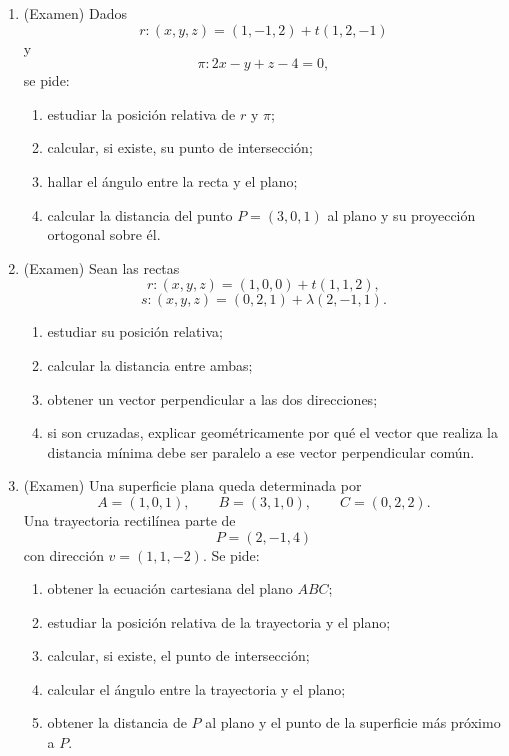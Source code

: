\begin{enumerate}
\item (Examen) Dados
\[
r:(x,y,z)=(1,-1,2)+t(1,2,-1)
\]
y
\[
\pi:2x-y+z-4=0,
\]
se pide:
\begin{enumerate}[label=\alph*)]
\item estudiar la posición relativa de $r$ y $\pi$;
\item calcular, si existe, su punto de intersección;
\item hallar el ángulo entre la recta y el plano;
\item calcular la distancia del punto $P=(3,0,1)$ al plano y su proyección ortogonal sobre él.
\end{enumerate}

\item (Examen) Sean las rectas
\[
r:(x,y,z)=(1,0,0)+t(1,1,2),
\]
\[
s:(x,y,z)=(0,2,1)+\lambda(2,-1,1).
\]
\begin{enumerate}[label=\alph*)]
\item estudiar su posición relativa;
\item calcular la distancia entre ambas;
\item obtener un vector perpendicular a las dos direcciones;
\item si son cruzadas, explicar geométricamente por qué el vector que realiza la distancia mínima debe ser paralelo a ese vector perpendicular común.
\end{enumerate}

\item (Examen) Una superficie plana queda determinada por
\[
A=(1,0,1),\qquad B=(3,1,0),\qquad C=(0,2,2).
\]
Una trayectoria rectilínea parte de
\[
P=(2,-1,4)
\]
con dirección $v=(1,1,-2)$. Se pide:
\begin{enumerate}[label=\alph*)]
\item obtener la ecuación cartesiana del plano $ABC$;
\item estudiar la posición relativa de la trayectoria y el plano;
\item calcular, si existe, el punto de intersección;
\item calcular el ángulo entre la trayectoria y el plano;
\item obtener la distancia de $P$ al plano y el punto de la superficie más próximo a $P$.
\end{enumerate}

\end{enumerate}
